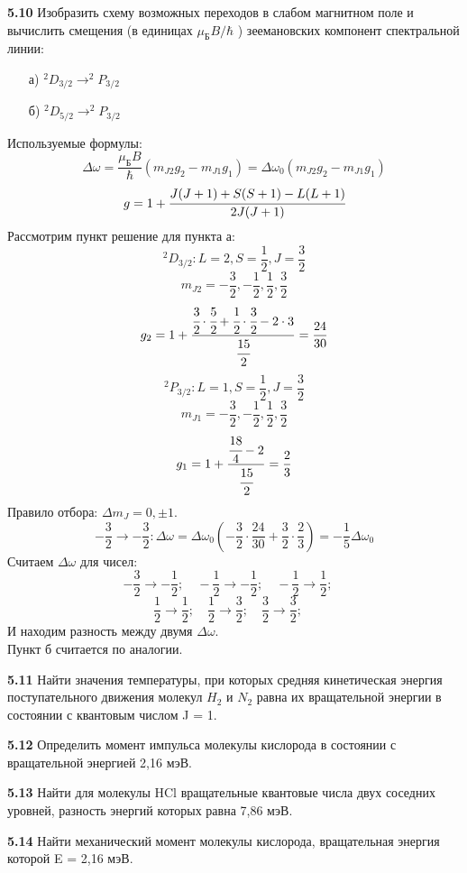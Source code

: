 	\textbf{5.10 }
		Изобразить схему возможных переходов в слабом магнитном поле и
		вычислить смещения (в единицах \( \mu_\text{Б}B/\hbar \) ) 
		зеемановских компонент спектральной линии: 
		\vspace*{-1em}
		\begin{itemize}\itemsep-8pt
			\item[а)] \( ^2D_{3/2} \rightarrow ^2P_{3/2} \)
			\item[б)] \( ^2D_{5/2} \rightarrow ^2P_{3/2} \)
		\end{itemize}
		Используемые формулы: 
		\[ 
			\Delta\omega = \frac{\mu_\text{Б}B}{\hbar}(m_{J2}g_2 - m_{J1}g_1)
			= \Delta\omega_0 (m_{J2}g_2 - m_{J1}g_1)
		\]
		\[ g = 1 + \cfrac{J(J+1)+S(S+1)-L(L+1)}{2J(J+1)} \]
		Рассмотрим пункт решение для пункта а:
		\[ ^2D_{3/2}: L=2, S=\frac{1}{2}, J=\frac{3}{2} \]
		\[ m_{J2} = -\frac{3}{2}, -\frac{1}{2}, \frac{1}{2}, \frac{3}{2} \]
		\[ 
			g_2 = 1 + \frac{\cfrac{3}{2}\cdot\cfrac{5}{2} 
			+ \cfrac{1}{2}\cdot\cfrac{3}{2} - 2\cdot3}{\cfrac{15}{2}} 
			= \frac{24}{30}
		\]
		\[ ^2P_{3/2}: L=1, S=\frac{1}{2}, J=\frac{3}{2} \]
		\[ m_{J1} = -\frac{3}{2}, -\frac{1}{2}, \frac{1}{2}, \frac{3}{2} \]
		\[ g_1 = 1 + \frac{\cfrac{18}{4} - 2}{\cfrac{15}{2}} = \frac{2}{3} \]
		Правило отбора: \( \Delta m_J = 0, \pm1 \).
		\[ -\frac{3}{2} \rightarrow -\frac{3}{2}: 
			\Delta\omega = \Delta\omega_0 (-\frac{3}{2}\cdot\frac{24}{30} 
			+ \frac{3}{2}\cdot\frac{2}{3}) = -\frac{1}{5}\Delta\omega_0 
		\]
		Считаем \( \Delta\omega \) для чисел:
		\[ 
			-\frac{3}{2} \rightarrow -\frac{1}{2};\quad
			-\frac{1}{2} \rightarrow -\frac{1}{2};\quad
			-\frac{1}{2} \rightarrow \frac{1}{2};\quad
		\]
		\[ 
			\frac{1}{2} \rightarrow \frac{1}{2};\quad
			\frac{1}{2} \rightarrow \frac{3}{2};\quad
			\frac{3}{2} \rightarrow \frac{3}{2};\quad
		\]
		И находим разность между двумя \( \Delta\omega \). \\
		Пункт б считается по аналогии.

	\textbf{5.11 }
		Найти значения температуры, при которых средняя кинетическая энергия
		поступательного движения молекул \( H_2 \) и \( N_2 \) равна их 
		вращательной энергии в состоянии с квантовым числом J = 1.

	\textbf{5.12 }
		Определить момент импульса молекулы кислорода в состоянии с
		вращательной энергией 2,16 мэВ.

	\textbf{5.13 }
		Найти для молекулы HCl вращательные квантовые числа двух соседних
		уровней, разность энергий которых равна 7,86 мэВ.

	\textbf{5.14 }
		Найти механический момент молекулы кислорода, вращательная энергия
		которой E = 2,16 мэВ.

